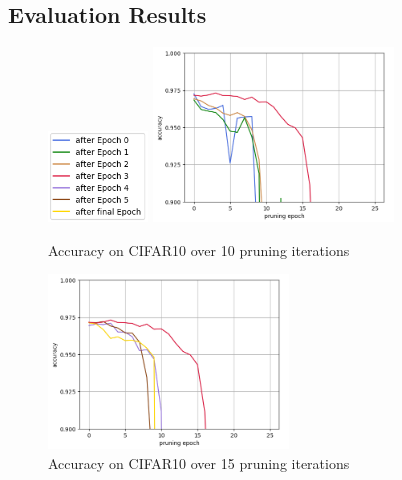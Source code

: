 \subsection*{Evaluation Results}
\begin{figure}
	\begin{minipage}{\textwidth}
		\centering
		\includegraphics[width=100px]{gfx/7-Evaluation/LTH_5_legend.png}
	\end{minipage}
	\begin{minipage}{0.5\textwidth}
		\centering
		\includegraphics[height=175px]{gfx/Experiments/EarlyTicket-MNIST-FCN/012.png}
		\caption*{Accuracy on CIFAR10 over 10 pruning iterations}
		\label{?}
	\end{minipage}\hfill
	\begin{minipage}{0.5\textwidth}
		\centering
		\includegraphics[height=175px]{gfx/Experiments/EarlyTicket-MNIST-FCN/345.png}
		\caption*{Accuracy on CIFAR10 over 15 pruning iterations}
		\label{?}
	\end{minipage}
\end{figure}
